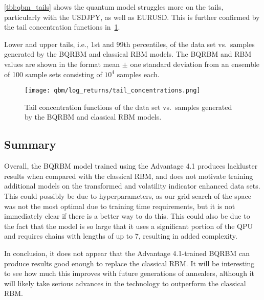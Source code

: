\cref{tbl:qbm_tails} shows the quantum model struggles more on the tails, particularly with the USDJPY, as well as EURUSD.
This is further confirmed by the tail concentration functions in~\cref{fig:qbm_log_returns_tail_concentrations}.
\begin{table}[!htb]
    \centering
    \begin{adjustbox}{max width=\textwidth}
        
    \end{adjustbox}
    \caption{
        Lower and upper tails, i.e., 1st and 99th percentiles, of the data set vs.~samples generated by the BQRBM and classical RBM models.
        The BQRBM and RBM values are shown in the format mean \(\pm\) one standard deviation from an ensemble of 100 sample sets consisting of \( 10^4 \) samples each.
    }
    \label{tbl:qbm_tails}
\end{table}

\begin{figure}[!htb]
    \begin{center}
        \texttt{[image: qbm/log\_returns/tail\_concentrations.png]}
    \end{center}
    \caption{Tail concentration functions of the data set vs.~samples generated by the BQRBM and classical RBM models.}
    \label{fig:qbm_log_returns_tail_concentrations}
\end{figure}

\subsection{Summary}
Overall, the BQRBM model trained using the Advantage 4.1 produces lackluster results when compared with the classical RBM, and does not motivate training additional models on the transformed and volatility indicator enhanced data sets.
This could possibly be due to hyperparameters, as our grid search of the space was not the most optimal due to training time requirements, but it is not immediately clear if there is a better way to do this.
This could also be due to the fact that the model is so large that it uses a significant portion of the QPU and requires chains with lengths of up to 7, resulting in added complexity.

In conclusion, it does not appear that the Advantage 4.1-trained BQRBM can produce results good enough to replace the classical RBM.
It will be interesting to see how much this improves with future generations of annealers, although it will likely take serious advances in the technology to outperform the classical RBM.

